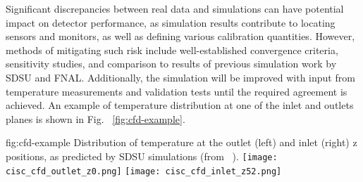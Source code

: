 Significant discrepancies between real data and simulations can have potential impact on detector performance, as simulation results contribute to locating sensors and monitors, as well as defining various calibration quantities. However, methods of mitigating such risk include well-established convergence criteria, sensitivity studies, and comparison to results of previous  simulation work by SDSU and FNAL. Additionally, the simulation will be improved with input from temperature measurements and validation tests until the required agreement is achieved. An example of temperature distribution at one of the  inlet and outlets planes is shown in Fig. ~\ref{fig:cfd-example}. 



\begin{dunefigure}{fig:cfd-example}
  {Distribution of temperature at the outlet (left) and inlet (right) z positions, as predicted by SDSU  simulations (from ~\cite{docdb-5915}). }
  \texttt{[image: cisc\_cfd\_outlet\_z0.png]}
  \texttt{[image: cisc\_cfd\_inlet\_z52.png]}
\end{dunefigure}
